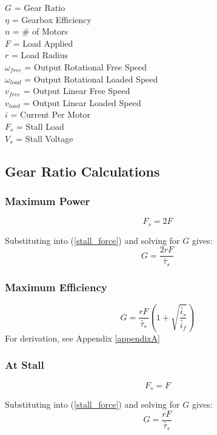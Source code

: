 \documentclass[11pt,a4paper,titlepage]{article}
\begin{document}
	$G$ = Gear Ratio \\
	$\eta$ = Gearbox Efficiency \\
	$n$ = \# of Motors \\
	$F$ = Load Applied \\
	$r$ = Load Radius \\
	$\omega_{free}$ = Output Rotational Free Speed \\
	$\omega_{load}$ = Output Rotational Loaded Speed \\
	$v_{free}$ = Output Linear Free Speed \\
	$v_{load}$ = Output Linear Loaded Speed \\
	$i$ = Current Per Motor \\
	$F_s$ = Stall Load \\
	$V_s$ = Stall Voltage
	
	\subsection{Gear Ratio Calculations}
	\subsubsection{Maximum Power}
	\begin{equation}
		F_s = 2 F
	\end{equation}
	
	Substituting into (\ref{stall_force}) and solving for $G$ gives:
	\begin{equation}
		G = \frac{2 r F}{\tilde{\tau_s}}
	\end{equation}
	
	\subsubsection{Maximum Efficiency}
	\begin{equation} \label{max_eff}
		G = \frac{r F}{\tilde{\tau_s}} \left( 1 + \sqrt{\frac{\tilde{i_s}}{\tilde{i_f}}} \right)
	\end{equation}
	For derivation, see Appendix \ref{appendixA}
	
	\newpage
	\subsubsection{At Stall}
	\begin{equation}
		F_s = F
	\end{equation}
	
	Substituting into (\ref{stall_force}) and solving for $G$ gives:
	\begin{equation}
	G = \frac{r F}{\tilde{\tau_s}}
	\end{equation}
	
\end{document}
